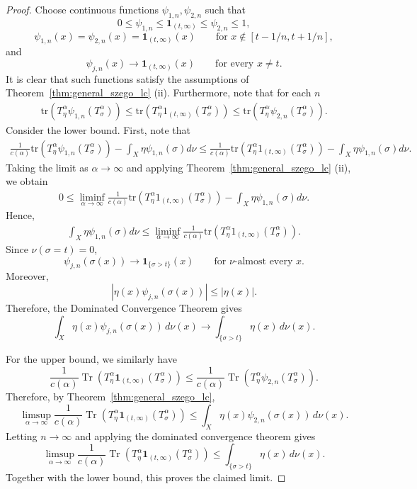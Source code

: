 \documentclass{amsart}
\theoremstyle{definition}
\theoremstyle{remark}
\numberwithin{equation}{section}
\begin{document}
\begin{proof} Choose continuous functions $\psi_{1,n},\psi_{2,n}$ such that
\[
0\leq\psi_{1,n}
\leq\mathbf 1_{(t,\infty)}
\leq\psi_{2,n}\leq1,
\]
\[
\psi_{1,n}(x)=\psi_{2,n}(x)
=\mathbf 1_{(t,\infty)}(x)
\qquad\text{for }x\notin
[t-1/n,t+1/n],
\]
and
\[
\psi_{j,n}(x)\longrightarrow
\mathbf 1_{(t,\infty)}(x)
\qquad\text{for every }x\neq t.
\]
It is clear that such functions satisfy the assumptions of Theorem~\ref{thm:general_szego_lc} (ii). Furthermore, note that for each $n$
\begin{align*}
    \text{tr}\left(T_{\eta}^{\alpha}\psi_{1,n}\left(T_{\sigma}^{\alpha}\right)\right)\leq\text{tr}\left(T_{\eta}^{\alpha} 1_{(t,\infty)}\left(T_{\sigma}^{\alpha}\right)\right)\leq\text{tr}\left(T_{\eta}^{\alpha}\psi_{2,n}\left(T_{\sigma}^{\alpha}\right)\right).
\end{align*}
Consider the lower bound. First, note that 
\begin{align*}
    \frac{1}{c(\alpha)}\text{tr}\left(T_{\eta}^{\alpha}\psi_{1,n}\left(T_{\sigma}^{\alpha}\right)\right)-\int_{X}\eta\psi_{1,n}(\sigma)d\nu\leq\frac{1}{c(\alpha)}\text{tr}\left(T_{\eta}^{\alpha} 1_{(t,\infty)}\left(T_{\sigma}^{\alpha}\right)\right)-\int_{X}\eta\psi_{1,n}(\sigma)d\nu.
\end{align*}
Taking the limit as $\alpha\to\infty$ and applying Theorem~\ref{thm:general_szego_lc} (ii), we obtain 
\begin{align*}
    0\leq\liminf_{\alpha\to\infty}\frac{1}{c(\alpha)}\text{tr}\left(T_{\eta}^{\alpha} 1_{(t,\infty)}\left(T_{\sigma}^{\alpha}\right)\right)-\int_{X}\eta\psi_{1,n}(\sigma)d\nu.
\end{align*}
Hence, 
\begin{align*}
    \int_{X}\eta\psi_{1,n}(\sigma)d\nu\leq\liminf_{\alpha\to\infty}\frac{1}{c(\alpha)}\text{tr}\left(T_{\eta}^{\alpha} 1_{(t,\infty)}\left(T_{\sigma}^{\alpha}\right)\right).
\end{align*}
Since $\nu(\sigma=t)=0$,
\[
\psi_{j,n}(\sigma(x))
\longrightarrow
\mathbf 1_{\{\sigma>t\}}(x)
\qquad\text{for $\nu$-almost every }x.
\]
Moreover,
\[
\left|\eta(x)\psi_{j,n}(\sigma(x))\right|
\leq |\eta(x)|.
\]
Therefore, the Dominated Convergence Theorem gives
\[
\int_X\eta(x)\psi_{j,n}(\sigma(x))\,d\nu(x)
\longrightarrow
\int_{\{\sigma>t\}}\eta(x)\,d\nu(x).
\]

For the upper bound, we similarly have
\[
\frac{1}{c(\alpha)}
\operatorname{Tr}\!\left(
T_\eta^\alpha
\mathbf{1}_{(t,\infty)}(T_\sigma^\alpha)
\right)
\le
\frac{1}{c(\alpha)}
\operatorname{Tr}\!\left(
T_\eta^\alpha
\psi_{2,n}(T_\sigma^\alpha)
\right).
\]
Therefore, by Theorem~\ref{thm:general_szego_lc},
\[
\limsup_{\alpha\to\infty}
\frac{1}{c(\alpha)}
\operatorname{Tr}\!\left(
T_\eta^\alpha
\mathbf{1}_{(t,\infty)}(T_\sigma^\alpha)
\right)
\le
\int_X \eta(x)\psi_{2,n}(\sigma(x))\,d\nu(x).
\]
Letting \(n\to\infty\) and applying the dominated convergence theorem gives
\[
\limsup_{\alpha\to\infty}
\frac{1}{c(\alpha)}
\operatorname{Tr}\!\left(
T_\eta^\alpha
\mathbf{1}_{(t,\infty)}(T_\sigma^\alpha)
\right)
\le
\int_{\{\sigma>t\}}\eta(x)\,d\nu(x).
\]
Together with the lower bound, this proves the claimed limit.

\end{proof}
\end{document}
